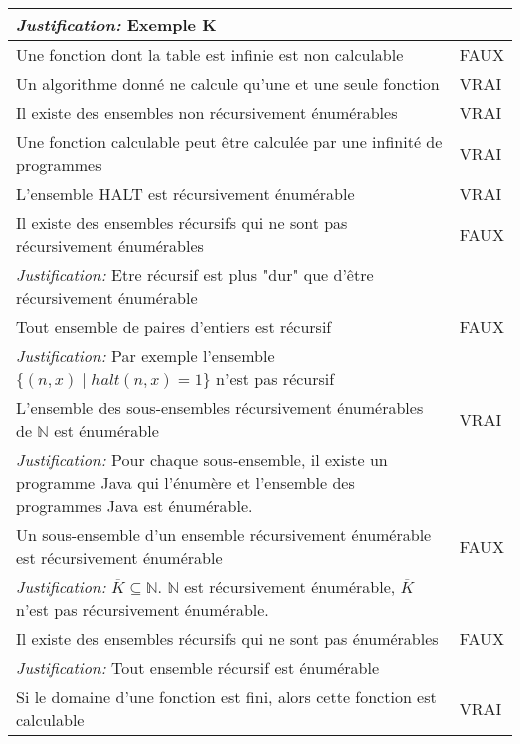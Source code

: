 \begin{longtable}{p{13cm}|l}
    \textit{Justification:} Exemple K \\
    \hline
    Une fonction dont la table est infinie est non calculable & FAUX \\
    \hline
    Un algorithme donné ne calcule qu'une et une seule fonction & VRAI \\
    \hline
    Il existe des ensembles non récursivement énumérables & VRAI \\
    \hline
    Une fonction calculable peut être calculée par une infinité de programmes & VRAI \\
    \hline
    L'ensemble HALT est récursivement énumérable & VRAI \\
    \hline
    Il existe des ensembles récursifs qui ne sont pas récursivement énumérables & FAUX \\
    \textit{Justification:} Etre récursif est plus "dur" que d'être récursivement énumérable \\
    \hline
    Tout ensemble de paires d'entiers est récursif & FAUX \\
    \textit{Justification:} Par exemple l'ensemble $\{(n,x) \mid \mathit{halt}(n,x)=1\}$ n'est pas récursif & \\
    \hline
    L'ensemble des sous-ensembles récursivement énumérables de $\mathbb{N}$ est énumérable & VRAI \\
    \textit{Justification:} Pour chaque sous-ensemble, il existe un programme Java qui l'énumère et l'ensemble des programmes Java est énumérable. & \\
    \hline
    Un sous-ensemble d'un ensemble récursivement énumérable est récursivement énumérable & FAUX \\
    \textit{Justification:} $\overline{K} \subseteq \mathbb{N}$. $\mathbb{N}$ est récursivement énumérable, $\overline{K}$ n'est pas récursivement énumérable. & \\
    \hline
    Il existe des ensembles récursifs qui ne sont pas énumérables & FAUX \\
    \textit{Justification:} Tout ensemble récursif est énumérable \\
    \hline
    Si le domaine d'une fonction est fini, alors cette fonction est calculable & VRAI \\

\end{longtable}

